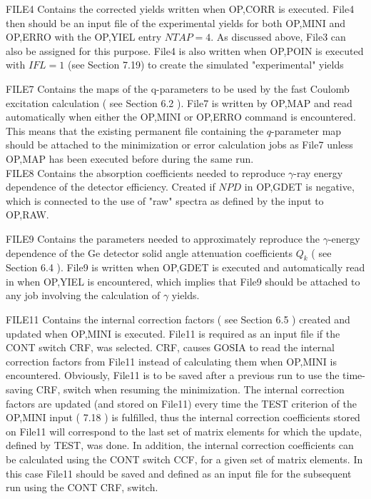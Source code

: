 \documentclass[10pt]{article}
\begin{document}
FILE4 Contains the corrected yields written when OP,CORR is executed. File4 then should be an input file of the experimental yields for both OP,MINI and OP,ERRO with the OP,YIEL entry $N T A P=4$. As discussed above, File3 can also be assigned for this purpose. File4 is also written when OP,POIN is executed with $I F L=1$ (see Section 7.19) to create the simulated "experimental" yields

FILE7 Contains the maps of the q-parameters to be used by the fast Coulomb excitation calculation ( see Section 6.2 ). File7 is written by OP,MAP and read automatically when either the OP,MINI or OP,ERRO command is encountered. This means that the existing permanent file containing the $q$-parameter map should be attached to the minimization or error calculation jobs as File7 unless OP,MAP has been executed before during the same run.\\
FILE8 Contains the absorption coefficients needed to reproduce $\gamma$-ray energy dependence of the detector efficiency. Created if $N P D$ in OP,GDET is negative, which is connected to the use of "raw" spectra as defined by the input to OP,RAW.

FILE9 Contains the parameters needed to approximately reproduce the $\gamma$-energy dependence of the Ge detector solid angle attenuation coefficients $Q_{k}$ ( see Section 6.4 ). File9 is written when OP,GDET is executed and automatically read in when OP,YIEL is encountered, which implies that File9 should be attached to any job involving the calculation of $\gamma$ yields.

FILE11 Contains the internal correction factors ( see Section 6.5 ) created and updated when OP,MINI is executed. File11 is required as an input file if the CONT switch CRF, was selected. CRF, causes GOSIA to read the internal correction factors from File11 instead of calculating them when OP,MINI is encountered. Obviously, File11 is to be saved after a previous run to use the time-saving CRF, switch when resuming the minimization. The internal correction factors are updated (and stored on File11) every time the TEST criterion of the OP,MINI input ( 7.18 ) is fulfilled, thus the internal correction coefficients stored on File11 will correspond to the last set of matrix elements for which the update, defined by TEST, was done. In addition, the internal correction coefficients can be calculated using the CONT switch CCF, for a given set of matrix elements. In this case File11 should be saved and defined as an input file for the subsequent run using the CONT CRF, switch.
\end{document}
